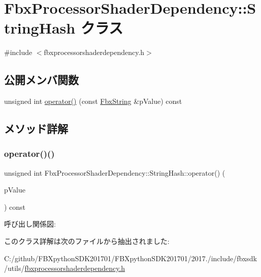 \hypertarget{class_fbx_processor_shader_dependency_1_1_string_hash}{}\section{Fbx\+Processor\+Shader\+Dependency\+:\+:String\+Hash クラス}
\label{class_fbx_processor_shader_dependency_1_1_string_hash}


{\ttfamily \#include $<$fbxprocessorshaderdependency.\+h$>$}

\subsection*{公開メンバ関数}
\begin{DoxyCompactItemize}
\item 
unsigned int \hyperlink{class_fbx_processor_shader_dependency_1_1_string_hash_a76ebff83fb3666e678a1ef8d181bea56}{operator()} (const \hyperlink{class_fbx_string}{Fbx\+String} \&p\+Value) const
\end{DoxyCompactItemize}


\subsection{メソッド詳解}
\mbox{\label{class_fbx_processor_shader_dependency_1_1_string_hash_a76ebff83fb3666e678a1ef8d181bea56}} 
\subsubsection{\texorpdfstring{operator()()}{operator()()}}
{\footnotesize\ttfamily unsigned int Fbx\+Processor\+Shader\+Dependency\+::\+String\+Hash\+::operator() (\begin{DoxyParamCaption}\item[{const \hyperlink{class_fbx_string}{Fbx\+String} \&}]{p\+Value }\end{DoxyParamCaption}) const}

呼び出し関係図\+:


このクラス詳解は次のファイルから抽出されました\+:\begin{DoxyCompactItemize}
\item 
C\+:/github/\+F\+B\+Xpython\+S\+D\+K201701/\+F\+B\+Xpython\+S\+D\+K201701/2017./include/fbxsdk/utils/\hyperlink{fbxprocessorshaderdependency_8h}{fbxprocessorshaderdependency.\+h}\end{DoxyCompactItemize}
